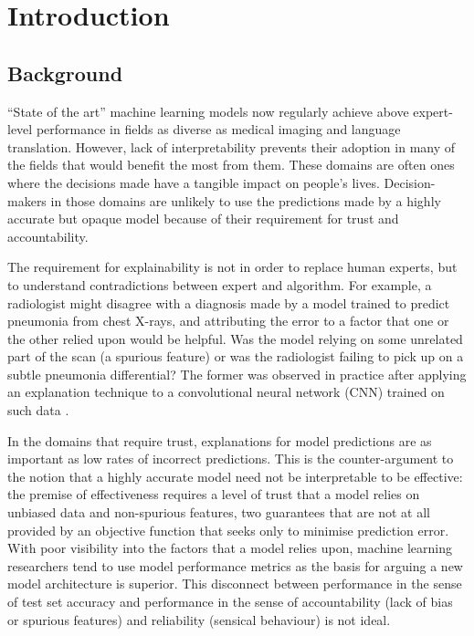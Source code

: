 \documentclass[main]{subfiles}
\begin{document}
\chapter{Introduction}

\section{Background} \label{sec:background}

``State of the art'' machine learning models now regularly achieve above expert-level performance in fields as diverse as medical imaging and language translation. However, lack of interpretability prevents their adoption in many of the fields that would benefit the most from them. These domains are often ones where the decisions made have a tangible impact on people's lives. Decision-makers in those domains are unlikely to use the predictions made by a highly accurate but opaque model because of their requirement for trust and accountability.

The requirement for explainability is not in order to replace human experts, but to understand contradictions between expert and algorithm. For example, a radiologist might disagree with a diagnosis made by a model trained to predict pneumonia from chest X-rays, and attributing the error to a factor that one or the other relied upon would be helpful. Was the model relying on some unrelated part of the scan (a spurious feature) or was the radiologist failing to pick up on a subtle pneumonia differential? The former was observed in practice after applying an explanation technique to a convolutional neural network (CNN) trained on such data \cite{xray}. 

In the domains that require trust, explanations for model predictions are as important as low rates of incorrect predictions. This is the counter-argument to the notion that a highly accurate model need not be interpretable to be effective: the premise of effectiveness requires a level of trust that a model relies on unbiased data and non-spurious features, two guarantees that are not at all provided by an objective function that seeks only to minimise prediction error. With poor visibility into the factors that a model relies upon, machine learning researchers tend to use model performance metrics as the basis for arguing a new model architecture is superior. This disconnect between performance in the sense of test set accuracy and performance in the sense of accountability (lack of bias or spurious features) and reliability (sensical behaviour) is not ideal.
\end{document}
